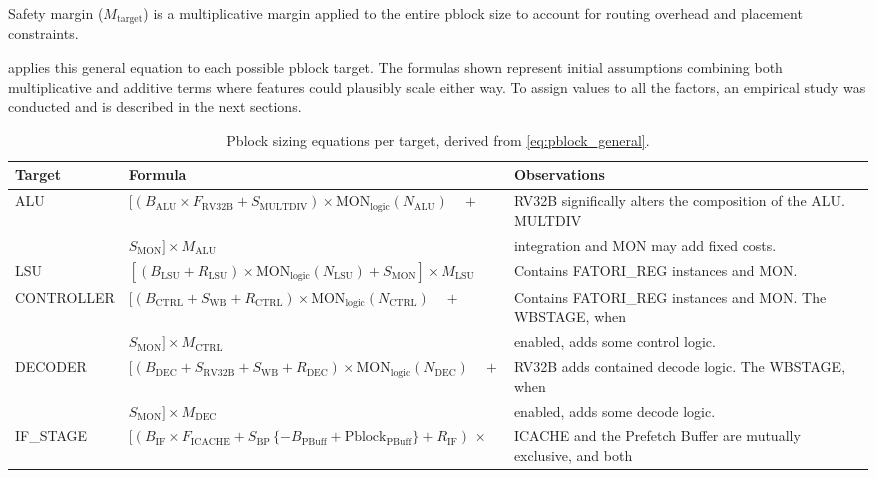 Safety margin ($M_{\text{target}}$) is a multiplicative margin applied to the entire pblock size to account for routing overhead and placement constraints.

 applies this general equation to each possible pblock target. The formulas shown represent initial assumptions combining both multiplicative and additive terms where features could plausibly scale either way. To assign values to all the factors, an empirical study was conducted and is described in the next sections.

\begin{table}[htbp]
\centering
\caption{Pblock sizing equations per target, derived from \cref{eq:pblock_general}.}
\label{tab:pblock_model}
\setlength{\tabcolsep}{4pt}
\scriptsize
\renewcommand{\arraystretch}{1.4}
\begin{tabularx}{\linewidth}{@{}lp{6cm}X@{}}
\toprule
Target & Formula & Observations \\
\midrule
ALU & $[( B_{\text{ALU}} \times F_{\text{RV32B}} + S_{\text{MULTDIV}}) \times \text{MON}_{\text{logic}}(N_{\text{ALU}}) \quad +$ & RV32B significally alters the composition of the ALU. MULTDIV\\
& $ S_{\text{MON}}] \times M_{\text{ALU}}$ &  integration and MON may add fixed costs. \\
\midrule
LSU & $\left[ (B_{\text{LSU}} + R_{\text{LSU}})  \times \text{MON}_{\text{logic}}(N_{\text{LSU}}) + S_{\text{MON}} \right] \times M_{\text{LSU}}$ & Contains FATORI\_REG instances and MON. \\
\midrule
CONTROLLER & $[ (B_{\text{CTRL}} + S_{\text{WB}} + R_{\text{CTRL}}) \times \text{MON}_{\text{logic}}(N_{\text{CTRL}}) \quad +$ & Contains FATORI\_REG instances and MON. The WBSTAGE, when \\
& $S_{\text{MON}}] \times M_{\text{CTRL}}$ & enabled, adds some control logic. \\
\midrule
DECODER & $[ (B_{\text{DEC}} + S_{\text{RV32B}} + S_{\text{WB}} + R_{\text{DEC}}) \times \text{MON}_{\text{logic}}(N_{\text{DEC}}) \quad +$& RV32B adds contained decode logic. The WBSTAGE, when \\
&$ S_{\text{MON}} ] \times M_{\text{DEC}}$ & enabled, adds some decode logic. \\
\midrule
IF\_STAGE & $[ (B_{\text{IF}} \times F_{\text{ICACHE}} + S_{\text{BP}} \, \{- B_{\text{PBuff}} + \text{Pblock}_{\text{PBuff}} \}+ R_{\text{IF}}) \, \times$ & ICACHE and the Prefetch Buffer are mutually exclusive, and both \\ 

\end{tabularx}
\end{table}
